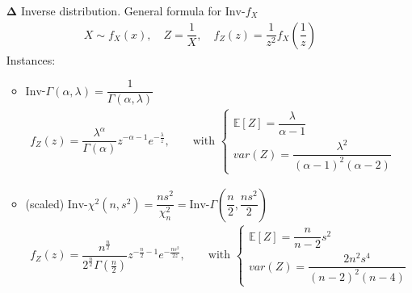 \begin{itemize}[topsep=2pt,itemsep=0pt]
    
    
    \item[$ \bm{\Delta } $] Inverse distribution. General formula for $ \mathrm{Inv}$-$f_X  $
    \begin{align*}
        X\sim f_X(x),\quad Z=\dfrac{1}{X},\quad f_Z(z)=\dfrac{1}{z^2}f_X(\dfrac{1}{z}) 
    \end{align*}
    Instances:
    \begin{itemize}[topsep=2pt,itemsep=0pt]
        \item $ \mathrm{Inv}  $-$ \Gamma (\alpha ,\lambda  )= \dfrac{1}{\Gamma (\alpha ,\lambda  )}$
        \begin{align*}
            f_Z(z)=\dfrac{\lambda ^\alpha }{\Gamma (\alpha )}z^{-\alpha -1}e^{-\frac{\lambda }{z}}  ,\qquad \text{with } \begin{cases}
                \mathbb{E}\left[ Z \right] =\dfrac{\lambda }{\alpha -1}\\
                var(Z)=\dfrac{\lambda ^2}{(\alpha -1)^2(\alpha -2)} 
            \end{cases}
        \end{align*}
        \item (scaled) $ \mathrm{Inv}$-$\chi^2(n,s^2)=\dfrac{ns^2}{\chi^2_n}=\mathrm{Inv}$-$ \Gamma (\dfrac{n}{2},\dfrac{ns^2}{2}) $
        \begin{align*}
            f_Z(z)= \dfrac{n^{\frac{n}{2}}}{2^{\frac{n}{2}}\Gamma (\frac{n}{2})}z^{-\frac{n}{2}-1}e^{-\frac{ns^2}{2z}} ,\qquad \text{with }\begin{cases}
                \mathbb{E}\left[ Z \right]=\dfrac{n}{n-2}s^2\\
                 var(Z)=  \dfrac{2n^2s^4}{(n-2)^2(n-4)}
            \end{cases}
        \end{align*}
    

\end{itemize}
\end{itemize}
